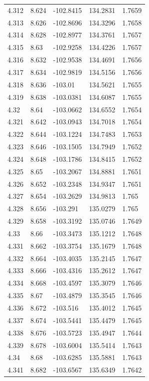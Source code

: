 \begin{tabular}{lllll}
4.312 & 8.624 & -102.8415 & 134.2831 & 1.7659 \\
4.313 & 8.626 & -102.8696 & 134.3296 & 1.7658 \\
4.314 & 8.628 & -102.8977 & 134.3761 & 1.7657 \\
4.315 & 8.63 & -102.9258 & 134.4226 & 1.7657 \\
4.316 & 8.632 & -102.9538 & 134.4691 & 1.7656 \\
4.317 & 8.634 & -102.9819 & 134.5156 & 1.7656 \\
4.318 & 8.636 & -103.01 & 134.5621 & 1.7655 \\
4.319 & 8.638 & -103.0381 & 134.6087 & 1.7655 \\
4.32 & 8.64 & -103.0662 & 134.6552 & 1.7654 \\
4.321 & 8.642 & -103.0943 & 134.7018 & 1.7654 \\
4.322 & 8.644 & -103.1224 & 134.7483 & 1.7653 \\
4.323 & 8.646 & -103.1505 & 134.7949 & 1.7652 \\
4.324 & 8.648 & -103.1786 & 134.8415 & 1.7652 \\
4.325 & 8.65 & -103.2067 & 134.8881 & 1.7651 \\
4.326 & 8.652 & -103.2348 & 134.9347 & 1.7651 \\
4.327 & 8.654 & -103.2629 & 134.9813 & 1.765 \\
4.328 & 8.656 & -103.291 & 135.0279 & 1.765 \\
4.329 & 8.658 & -103.3192 & 135.0746 & 1.7649 \\
4.33 & 8.66 & -103.3473 & 135.1212 & 1.7648 \\
4.331 & 8.662 & -103.3754 & 135.1679 & 1.7648 \\
4.332 & 8.664 & -103.4035 & 135.2145 & 1.7647 \\
4.333 & 8.666 & -103.4316 & 135.2612 & 1.7647 \\
4.334 & 8.668 & -103.4597 & 135.3079 & 1.7646 \\
4.335 & 8.67 & -103.4879 & 135.3545 & 1.7646 \\
4.336 & 8.672 & -103.516 & 135.4012 & 1.7645 \\
4.337 & 8.674 & -103.5441 & 135.4479 & 1.7645 \\
4.338 & 8.676 & -103.5723 & 135.4947 & 1.7644 \\
4.339 & 8.678 & -103.6004 & 135.5414 & 1.7643 \\
4.34 & 8.68 & -103.6285 & 135.5881 & 1.7643 \\
4.341 & 8.682 & -103.6567 & 135.6349 & 1.7642 \\

\end{tabular}
